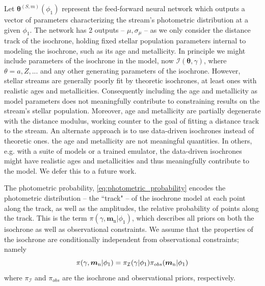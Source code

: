 \documentclass[twocolumn]{aastex631}
\newcommand{\mrm}[1]{\mathrm{#1}}
\newcommand{\mbs}[1]{\boldsymbol{#1}}
\newcommand{\mcal}[1]{\mathcal{#1}}
\newcommand{\prior}{\mcal{\pi}}
\newcommand{\nth}[1]{{#1}_{\mrm{n}}}  %
\newcommand{\smallcomponent}[2]{#2^{\scriptscriptstyle (#1)}}
\newcommand{\cmp}[2]{\smallcomponent{#1}{#2}}
\begin{document}
            Let $\cmp{S,m}{\mbs{\theta}}(\phi_1)$ represent the feed-forward
            neural network which outputs a vector of parameters characterizing
            the stream's photometric distribution at a given $\phi_1$. The
            network has 2 outputs -- $\mu, \sigma_\mu$ -- as we only consider
            the distance track of the isochrone, holding fixed stellar
            population parameters internal to modeling the isochrone, such as
            its age and metallicity.  In principle we might include parameters
            of the isochrone in the model, now $\mcal{I}(\mbs{\theta}, \gamma)$,
            where $\theta = {a, Z, ...}$ and any other generating parameters of
            the isochrone.
            However, stellar streams are generally poorly fit by theoretic
            isochrones, at least ones with realistic ages and metallicities.
            Consequently including the age and metallicity as model parameters
            does not meaningfully contribute to constraining results on the
            stream's stellar population. Moreover, age and metallicity are
            partially degenerate with the distance modulus, working counter to
            the goal of fitting a distance track to the stream. An alternate
            approach is to use data-driven isochrones instead of theoretic ones.
            the age and metallicity are not meaningful quantities. In others,
            e.g. with a suite of models or a trained emulator, the data-driven
            isochrones might have realistic ages and metallicities and thus
            meaningfully contribute to the model.
            We defer this to a future work.

            The photometric probability, \autoref{eq:photometric_probability}
            encodes the photometric distribution -- the ``track" -- of the
            isochrone model at each point along the track, as well as the
            amplitudes, the relative probability of points along the track. This
            is the term $\prior(\gamma, \nth{\mbs{m}} | \phi_1)$, which
            describes all priors on both the isochrone as well as observational
            constraints. We assume that the properties of the isochrone are
            conditionally independent from observational constraints; namely
            \begin{equation} \label{eq:isochrone_prior_components}
                \prior(\gamma, \nth{\mbs{m}} | \phi_1) = \prior_{\cal{I}}(\gamma | \phi_1) \prior_{obs}(\nth{\mbs{m}} | \phi_1)
            \end{equation}
            where $\prior_{\mcal{I}}$ and $\prior_{obs}$ are the isochrone and
            observational priors, respectively.
            
\end{document}
